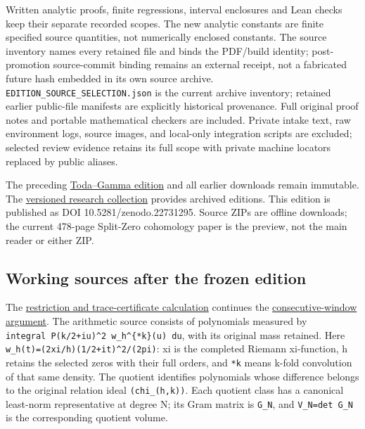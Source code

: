 \documentclass[
]{article}
\begin{document}
Written analytic proofs, finite regressions, interval enclosures and
Lean checks keep their separate recorded scopes. The new analytic
constants are finite specified source quantities, not numerically
enclosed constants. The source inventory names every retained file and
binds the PDF/build identity; post-promotion source-commit binding
remains an external receipt, not a fabricated future hash embedded in
its own source archive. \texttt{EDITION\_SOURCE\_SELECTION.json} is the
current archive inventory; retained earlier public-file manifests are
explicitly historical provenance. Full original proof notes and portable
mathematical checkers are included. Private intake text, raw environment
logs, source images, and local-only integration scripts are excluded;
selected review evidence retains its full scope with private machine
locators replaced by public aliases.

The preceding \href{https://doi.org/10.5281/zenodo.22730756}{Toda--Gamma
edition} and all earlier downloads remain immutable. The
\href{https://doi.org/10.5281/zenodo.22678085}{versioned research
collection} provides archived editions. This edition is published as DOI
10.5281/zenodo.22731295. Source ZIPs are offline downloads; the current
478-page Split-Zero cohomology paper is the preview, not the main reader
or either ZIP.

\subsection{Working sources after the frozen
edition}\label{working-sources-after-the-frozen-edition}

The
\href{workbenches/tau-restriction-certificate-formal/RESEARCH_NOTE.md}{restriction
and trace-certificate calculation} continues the
\href{workbenches/tau-consecutive-window-formal/RESEARCH_NOTE.md}{consecutive-window
argument}. The arithmetic source consists of polynomials measured by
\texttt{integral\ \textbar{}P(k/2+iu)\textbar{}\^{}2\ w\_h\^{}\{*k\}(u)\ du},
with its original mass retained. Here
\texttt{w\_h(t)=\textbar{}(2xi/h)(1/2+it)\textbar{}\^{}2/(2pi)}: xi is
the completed Riemann xi-function, h retains the selected zeros with
their full orders, and \texttt{*k} means k-fold convolution of that same
density. The quotient identifies polynomials whose difference belongs to
the original relation ideal \texttt{(chi\_(h,k))}. Each quotient class
has a canonical least-norm representative at degree N; its Gram matrix
is \texttt{G\_N}, and \texttt{V\_N=det\ G\_N} is the corresponding
quotient volume.
\end{document}
